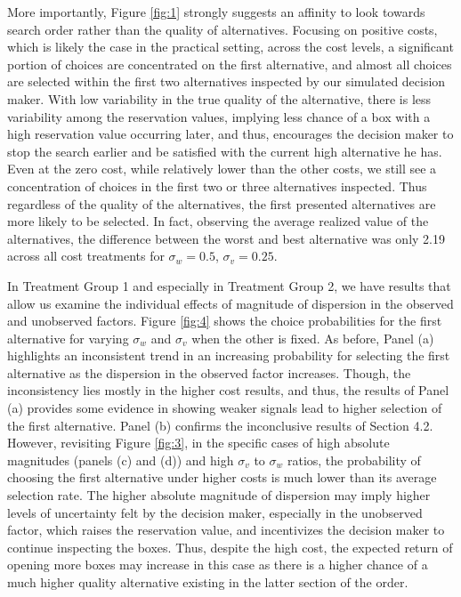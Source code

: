 \documentclass[12pt]{article}
\begin{document}
More importantly, Figure \ref{fig:1} strongly suggests an affinity to look towards search order rather than the quality of alternatives. Focusing on positive costs, which is likely the case in the practical setting, across the cost levels, a significant portion of choices are concentrated on the first alternative, and almost all choices are selected within the first two alternatives inspected by our simulated decision maker. With low variability in the true quality of the alternative, there is less variability among the reservation values, implying less chance of a box with a high reservation value occurring later, and thus, encourages the decision maker to stop the search earlier and be satisfied with the current high alternative he has. Even at the zero cost, while relatively lower than the other costs, we still see a concentration of choices in the first two or three alternatives inspected. Thus regardless of the quality of the alternatives, the first presented alternatives are more likely to be selected. In fact, observing the average realized value of the alternatives, the difference between the worst and best alternative was only 2.19 across all cost treatments for \(\sigma_w=0.5\), \(\sigma_v=0.25\).

In Treatment Group 1 and especially in Treatment Group 2, we have results that allow us examine the individual effects of magnitude of dispersion in the observed and unobserved factors. Figure \ref{fig:4} shows the choice probabilities for the first alternative for varying \(\sigma_w\) and \(\sigma_v\) when the other is fixed. As before, Panel (a) highlights an inconsistent trend in an increasing probability for selecting the first alternative as the dispersion in the observed factor increases. Though, the inconsistency lies mostly in the higher cost results, and thus, the results of Panel (a) provides some evidence in showing weaker signals lead to higher selection of the first alternative. Panel (b) confirms the inconclusive results of Section 4.2. However, revisiting Figure \ref{fig:3}, in the specific cases of high absolute magnitudes (panels (c) and (d)) and high \(\sigma_v\) to \(\sigma_w\) ratios, the probability of choosing the first alternative under higher costs is much lower than its average selection rate. The higher absolute magnitude of dispersion may imply higher levels of uncertainty felt by the decision maker, especially in the unobserved factor, which raises the reservation value, and incentivizes the decision maker to continue inspecting the boxes. Thus, despite the high cost, the expected return of opening more boxes may increase in this case as there is a higher chance of a much higher quality alternative existing in the latter section of the order.
\end{document}
